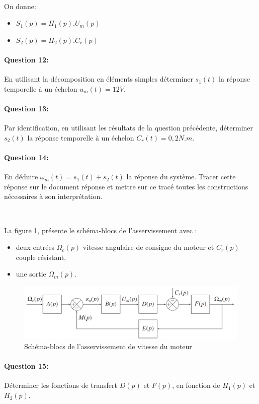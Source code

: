 ~\

On donne:
\begin{itemize}
 \item $S_1(p)=H_1(p).U_m(p)$
 \item $S_2(p)=H_2(p).C_r(p)$
\end{itemize}

\paragraph{Question 12:} En utilisant la décomposition en éléments simples déterminer $s_1(t)$ la réponse temporelle à un échelon $u_m(t)=12V$.

\paragraph{Question 13:} Par identification, en utilisant les résultats de la question précédente, déterminer $s_2(t)$ la réponse temporelle à un échelon $C_r(t)=0,2N.m$.

\paragraph{Question 14:} En déduire $\omega_m(t)=s_1(t)+s_2(t)$ la réponse du système. Tracer cette réponse sur le document réponse et mettre sur ce tracé toutes les constructions nécessaires à son interprétation.

~\

La figure \ref{img15}, présente le schéma-blocs de l'asservissement avec :
\begin{itemize}
 \item deux entrées $\Omega_c(p)$ vitesse angulaire de consigne du moteur et $C_r(p)$ couple résistant,
 \item une sortie $\Omega_m(p)$.
\end{itemize}


\begin{figure}[!h]
 \centering\includegraphics[width=0.9\linewidth]{img/img15}
 \caption{Schéma-blocs de l'asservissement de vitesse du moteur}
 \label{img15}
\end{figure}

\paragraph{Question 15:} Déterminer les fonctions de transfert $D(p)$ et $F(p)$, en fonction de $H_1(p)$ et $H_2(p)$.

